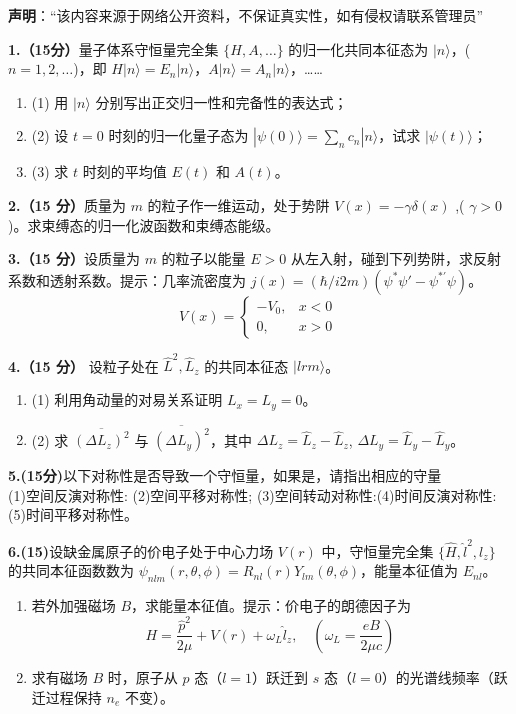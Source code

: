 
\textbf{声明}：“该内容来源于网络公开资料，不保证真实性，如有侵权请联系管理员”

\textbf{1.（15分）}量子体系守恒量完全集 $\{H, A, \dots\}$ 的归一化共同本征态为 $|n\rangle$，($n=1, 2, \dots$)，即 $H|n\rangle = E_n|n\rangle$，$A|n\rangle = A_n|n\rangle$，……
\begin{enumerate}
    \item (1) 用 $|n\rangle$ 分别写出正交归一性和完备性的表达式；
    \item (2) 设 $t=0$ 时刻的归一化量子态为 $|\psi(0)\rangle = \sum_n c_n |n\rangle$，试求 $|\psi(t)\rangle$；
    \item (3) 求 $t$ 时刻的平均值 $E(t)$ 和 $A(t)$。
\end{enumerate}
\textbf{2.（15 分）}质量为 $m$ 的粒子作一维运动，处于势阱 $V(x) = -\gamma \delta(x)$ ,( $\gamma > 0$ )。求束缚态的归一化波函数和束缚态能级。

\textbf{3.（15 分）}设质量为 $m$ 的粒子以能量 $E > 0$ 从左入射，碰到下列势阱，求反射系数和透射系数。提示：几率流密度为 $j(x) =(\hbar/i2m)(\psi^*\psi'  - \psi^{*'}\psi)$。
$$V(x) = \begin{cases} 
-V_0, & x < 0 \\ 
0, & x > 0 
\end{cases}~$$

\textbf{4.（15 分）}
设粒子处在 $\hat L^2,\hat L_z$ 的共同本征态 $|lrm\rangle$。

\begin{enumerate}
    \item (1) 利用角动量的对易关系证明 $L_x = L_y = 0$。
    \item (2) 求 $\overline{(\Delta L_z)^2}$ 与 $\overline{(\Delta L_y)^2}$，其中 $\Delta L_z = \hat L_z -\hat L_z $, $\Delta L_y = \hat L_y -\hat L_y$。
\end{enumerate}

\textbf{5.(15分)}以下对称性是否导致一个守恒量，如果是，请指出相应的守量\\
(1)空间反演对称性: (2)空间平移对称性; (3)空间转动对称性:(4)时间反演对称性:(5)时间平移对称性。

\textbf{6.(15)}设缺金属原子的价电子处于中心力场 $V(r)$ 中，守恒量完全集 $\{\hat H, \hat{l}^2, l_z\}$ 的共同本征函数数为 $\psi_{nlm}(r, \theta, \phi) = R_{nl}(r)Y_{lm}(\theta, \phi)$，能量本征值为 $E_{nl}$。

\begin{enumerate}
    \item 若外加强磁场 $B$，求能量本征值。提示：价电子的朗德因子为
  $$H = \frac{\hat p^2}{2\mu} + V(r) + \omega_L \hat l_z, \quad (\omega_L = \frac{eB}{2\mu c})~$$
    \item 求有磁场 $B$ 时，原子从 $p$ 态（$l = 1$）跃迁到 $s$ 态（$l = 0$）的光谱线频率（跃迁过程保持 $n_e$ 不变）。
\end{enumerate}

